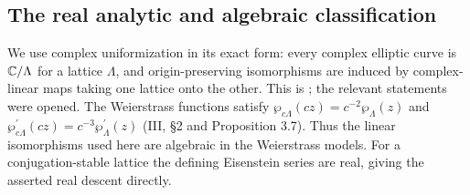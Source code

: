 \subsection{The real analytic and algebraic classification}
We use complex uniformization in its exact form: every complex elliptic curve is ${\mathbb{C}}/\Lambda$ for a lattice $\Lambda$, and origin-preserving isomorphisms are induced by complex-linear maps taking one lattice onto the other. This is \cite[III, Theorem 3.10 and Proposition 3.3]{MilneEC2021A567}; the relevant statements were opened. The Weierstrass functions satisfy $\wp_{c\Lambda}(cz)=c^{-2}\wp_\Lambda(z)$ and $\wp_{c\Lambda}^{\prime}(cz)=c^{-3}\wp_\Lambda^{\prime}(z)$ (III, \S2 and Proposition 3.7). Thus the linear isomorphisms used here are algebraic in the Weierstrass models. For a conjugation-stable lattice the defining Eisenstein series are real, giving the asserted real descent directly.

